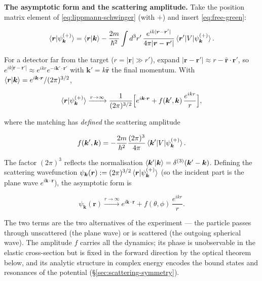 \medskip\noindent\textbf{The asymptotic form and the scattering amplitude.}
Take the position matrix element of \eqref{eq:lippmann-schwinger} (with $+$) and insert \eqref{eq:free-green}:
\begin{linenomath}
\begin{equation*}
\braket{\bm r|\psi_{\bm k}^{(+)}}=\braket{\bm r|\bm k}-\frac{2m}{\hbar^{2}}\int d^{3}r'\,\frac{e^{ik|\bm r-\bm r'|}}{4\pi|\bm r-\bm r'|}\braket{\bm r'|V|\psi_{\bm k}^{(+)}}.
\end{equation*}
\end{linenomath}
For a detector far from the target ($r=|\bm r|\gg r'$), expand $|\bm r-\bm r'|\approx r-\hat{\bm r}\!\cdot\!\bm r'$, so $e^{ik|\bm r-\bm r'|}\approx e^{ikr}e^{-i\bm k'\cdot\bm r'}$ with $\bm k'=k\hat{\bm r}$ the final momentum. With $\braket{\bm r|\bm k}=e^{i\bm k\cdot\bm r}/(2\pi)^{3/2}$,
\begin{linenomath}
\begin{equation*}
\braket{\bm r|\psi_{\bm k}^{(+)}}\xrightarrow{r\to\infty}\frac{1}{(2\pi)^{3/2}}\Bigl[e^{i\bm k\cdot\bm r}+f(\bm k',\bm k)\,\frac{e^{ikr}}{r}\Bigr],
\end{equation*}
\end{linenomath}
where the matching has \emph{defined} the scattering amplitude
\begin{linenomath}
\begin{equation}
f(\bm k',\bm k)=-\frac{2m}{\hbar^{2}}\frac{(2\pi)^{3}}{4\pi}\braket{\bm k'|V|\psi_{\bm k}^{(+)}}.
\label{eq:scattering-amplitude-ls}
\end{equation}
\end{linenomath}
The factor $(2\pi)^{3}$ reflects the normalisation $\braket{\bm k'|\bm k}=\delta^{(3)}(\bm k'-\bm k)$. Defining the scattering wavefunction $\psi_{\bm k}(\bm r):=(2\pi)^{3/2}\braket{\bm r|\psi_{\bm k}^{(+)}}$ (so the incident part is the plane wave $e^{i\bm k\cdot\bm r}$), the asymptotic form is
\begin{linenomath}
\begin{equation}
\psi_{\bm k}(\bm r)\xrightarrow{r\to\infty}e^{i\bm k\cdot\bm r}+f(\theta,\phi)\,\frac{e^{ikr}}{r}.
\label{eq:scattering-amplitude-def}
\end{equation}
\end{linenomath}
The two terms are the two alternatives of the experiment --- the particle passes through unscattered (the plane wave) or is scattered (the outgoing spherical wave). The amplitude $f$ carries all the dynamics; its phase is unobservable in the elastic cross-section but is fixed in the forward direction by the optical theorem below, and its analytic structure in complex energy encodes the bound states and resonances of the potential (\S\ref{sec:scattering-symmetry}).

